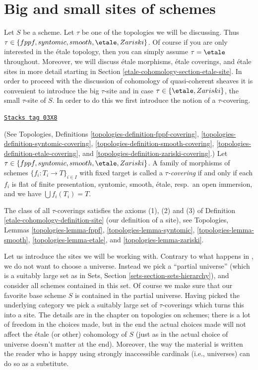\section{Big and small sites of schemes}
\label{etale-cohomology-section-big-small}
Let $S$ be a scheme.
Let $\tau$ be one of the topologies we will be discussing.
Thus $\tau \in \{fppf, syntomic, smooth, \etale, Zariski\}$.
Of course if you are only interested in the \'etale topology, then
you can simply assume $\tau = \etale$ throughout. Moreover, we will
discuss \'etale morphisms, \'etale coverings, and \'etale sites
in more detail starting in Section \ref{etale-cohomology-section-etale-site}.
In order to proceed with the discussion of cohomology of
quasi-coherent sheaves it is convenient to introduce the
big $\tau$-site and in case $\tau \in \{\etale, Zariski\}$, the
small $\tau$-site of $S$. In order to do this we first introduce
the notion of a $\tau$-covering.

\begin{definition}
\label{etale-cohomology-definition-tau-covering}
\href{https://stacks.math.columbia.edu/tag/03X8}{\texttt{Stacks tag 03X8}}

(See
Topologies, Definitions
\ref{topologies-definition-fppf-covering},
\ref{topologies-definition-syntomic-covering},
\ref{topologies-definition-smooth-covering},
\ref{topologies-definition-etale-covering}, and
\ref{topologies-definition-zariski-covering}.)
Let $\tau \in \{fppf, syntomic, smooth, \etale, Zariski\}$.
A family of morphisms of schemes $\{f_i : T_i \to T\}_{i \in I}$ with fixed
target is called a {\it $\tau$-covering} if and only if
each $f_i$ is flat of finite presentation, syntomic, smooth, \'etale,
resp.\ an open immersion, and we have $\bigcup f_i(T_i) = T$.
\end{definition}

The class of all $\tau$-coverings satisfies the axioms
(1), (2) and (3) of
Definition \ref{etale-cohomology-definition-site} (our definition of a site), see
Topologies, Lemmas
\ref{topologies-lemma-fppf},
\ref{topologies-lemma-syntomic},
\ref{topologies-lemma-smooth},
\ref{topologies-lemma-etale}, and
\ref{topologies-lemma-zariski}.

\medskip\noindent
Let us introduce the sites we will be working with.
Contrary to what happens in
\cite{SGA4}, we do not want to choose a universe. Instead we pick a ``partial
universe'' (which is a suitably large set as in
Sets, Section \ref{sets-section-sets-hierarchy}), and consider all schemes
contained in this set. Of course we make sure that our favorite base scheme
$S$ is contained in the partial universe. Having picked the underlying category
we pick a suitably large set of $\tau$-coverings which turns this into a site.
The details are in the chapter on topologies on schemes; there is a lot of
freedom in the choices made, but in the end the actual choices made will not
affect the \'etale (or other) cohomology of $S$ (just as in \cite{SGA4} the
actual choice of universe doesn't matter at the end). Moreover, the way the
material is written the reader who is happy using strongly inaccessible
cardinals (i.e., universes) can do so as a substitute.

